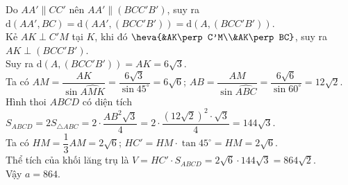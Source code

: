 \begin{ex}
{		Do $AA' \parallel CC'$ nên $AA' \parallel \left(BCC'B'\right)$, suy ra $\mathrm{d}\left(AA', BC\right)=\mathrm{d}\left(AA', \left(BCC'B'\right)\right)=\mathrm{d}\left(A, \left(BCC'B'\right)\right)$.\\
		Kẻ $AK \perp C'M$ tại $K$, khi đó $\heva{&AK\perp C'M\\&AK\perp BC}$, suy ra $AK\perp \left(BCC'B'\right)$.\\
		Suy ra $\mathrm{d}\left(A, \left(BCC'B'\right)\right)=AK=6\sqrt{3}$.\\
		Ta có $AM=\dfrac{AK}{\sin \widehat{AMK}}=\dfrac{6\sqrt{3}}{\sin 45^\circ}=6\sqrt{6}$; $AB=\dfrac{AM}{\sin \widehat{ABC}}=\dfrac{6\sqrt{6}}{\sin 60^\circ}=12\sqrt{2}$.\\
		Hình thoi $ABCD$ có diện tích $S_{ABCD}=2S_{\triangle ABC}=2\cdot \dfrac{AB^2\sqrt{3}}{4}=2\cdot \dfrac{\left(12\sqrt{2}\right)^2\cdot \sqrt{3}}{4}=144\sqrt{3}$.\\
		Ta có $HM=\dfrac{1}{3}AM=2\sqrt{6}$; $HC'=HM\cdot \tan 45^\circ=HM=2\sqrt{6}$.\\
		Thể tích của khối lăng trụ là $V=HC'\cdot S_{ABCD}=2\sqrt{6}\cdot 144\sqrt{3}=864\sqrt{2}$.\\
		Vậy $a=864$.
	}
\end{ex}

